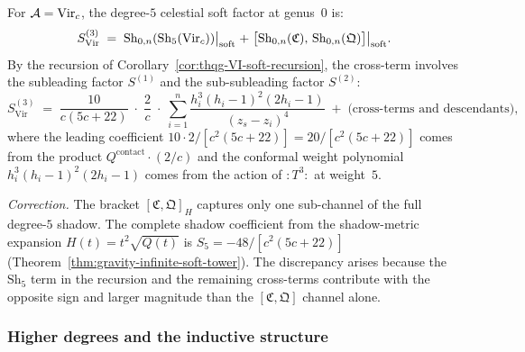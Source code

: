 \begin{computation}
For $\mathcal{A} = \mathrm{Vir}_c$, the degree-$5$ celestial soft factor at genus~$0$
is:
\begin{equation}%
S^{(3)}_{\mathrm{Vir}}
\;=\;
\Sh_{0,n}(\Sh_5(\mathrm{Vir}_c))\bigl|_{\text{soft}}
\;+\;
\bigl[\Sh_{0,n}(\mathfrak{C}),\,
\Sh_{0,n}(\mathfrak{Q})\bigr]\bigl|_{\text{soft}}.
\end{equation}
By the recursion of Corollary~\ref{cor:thqg-VI-soft-recursion}, the
cross-term involves the subleading factor $S^{(1)}$ and the
sub-subleading factor $S^{(2)}$:
\begin{equation}%
S^{(3)}_{\mathrm{Vir}}
\;=\;
\frac{10}{c(5c+22)}\;\cdot\;
\frac{2}{c}\;\cdot\;
\sum_{i=1}^{n}
\frac{h_i^3(h_i-1)^2(2h_i - 1)}{(z_s - z_i)^4}
\;+\; \text{(cross-terms and descendants)},
\end{equation}
where the leading coefficient $10\cdot 2/[c^2(5c+22)]
= 20/[c^2(5c+22)]$ comes from the product
$Q^{\mathrm{contact}} \cdot (2/c)$ and the conformal weight
polynomial $h_i^3(h_i-1)^2(2h_i-1)$ comes from the action
of $:T^3:$ at weight~$5$.

\emph{Correction.} The bracket $[\mathfrak{C},\mathfrak{Q}]_H$
captures only one sub-channel of the full degree-$5$ shadow.
The complete shadow coefficient from the shadow-metric expansion
$H(t) = t^2\sqrt{Q(t)}$ is $S_5 = -48/[c^2(5c+22)]$
(Theorem~\ref{thm:gravity-infinite-soft-tower}). The discrepancy
arises because the $\mathrm{Sh}_5$ term in the recursion and the
remaining cross-terms contribute with the opposite sign and
larger magnitude than the $[\mathfrak{C},\mathfrak{Q}]$ channel
alone.
\end{computation}

\subsubsection{Higher degrees and the inductive structure}

